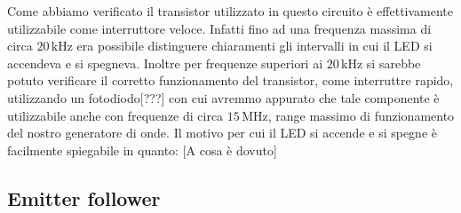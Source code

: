 Come abbiamo verificato il transistor utilizzato in questo circuito è effettivamente utilizzabile come interruttore veloce. Infatti fino ad una frequenza massima di circa $20\,\si{\kilo\hertz}$ era possibile distinguere chiaramenti gli intervalli in cui il LED si accendeva e si spegneva. Inoltre per frequenze superiori ai $20\,\si{\kilo\hertz}$  si sarebbe potuto verificare il corretto funzionamento del transistor, come interruttre rapido, utilizzando un fotodiodo[???] con cui avremmo appurato che tale componente è utilizzabile anche con frequenze di circa $15\,\si{\mega\hertz}$, range massimo di funzionamento del nostro generatore di onde.
Il motivo per cui il LED si accende e si spegne è facilmente spiegabile in quanto: [A cosa è dovuto]

\subsection{Emitter follower}

\subsection{}

\subsection{}
